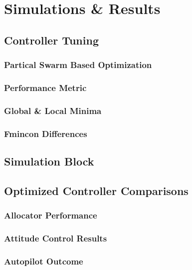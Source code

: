 \chapter{Simulations \& Results}
\label{ch:simulation}
\section{Controller Tuning}
\label{sec:simulation.tuning}
\subsection{Partical Swarm Based Optimization}
\label{subsec:simulation.tuning.pso}
\subsection{Performance Metric}
\label{subsec:simulation.tuning.metric}
\subsection{Global \& Local Minima}
\subsection{Fmincon Differences}

\section{Simulation Block}
\label{sec:simulation.block}

\section{Optimized Controller Comparisons}
\label{sec:simulation.comparison}
\subsection{Allocator Performance}
\subsection{Attitude Control Results}
\subsection{Autopilot Outcome}
